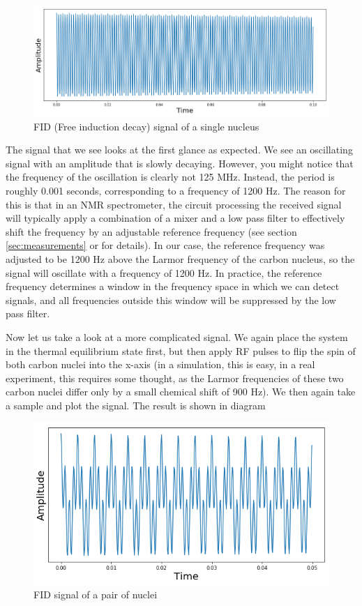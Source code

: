 \documentclass[a4paper, draft]{article}
\theoremstyle{own}
\theoremstyle{remark}
\begin{document}
\begin{figure}[ht]
\centering
\includegraphics[width=0.9\linewidth]{images/SingleNucleusNMRSignal}
\caption[FID (Free induction decay) signal of a single nucleus]{FID (Free induction decay) signal of a single nucleus}
\label{fig:SingleNucleusNMRSignal}
\end{figure}

The signal that we see looks at the first glance as expected. We see an oscillating signal with an amplitude that is slowly decaying. However, you might notice that the frequency of the oscillation is clearly not 125 MHz. Instead, the period is roughly 0.001 seconds, corresponding to a frequency of 1200 Hz. The reason for this is that in an NMR spectrometer, the circuit processing the received signal will typically apply a combination of a mixer and a low pass filter to effectively shift the frequency by an adjustable reference frequency (see section \ref{sec:measurements} or \cite{Levitt} for details). In our case, the reference frequency was adjusted to be 1200 Hz above the Larmor frequency of the carbon nucleus, so the signal will oscillate with a frequency of 1200 Hz. In practice, the reference frequency determines a window in the frequency space in which we can detect signals, and all frequencies outside this window will be suppressed by the low pass filter.

Now let us take a look at a more complicated signal. We again place the system in the thermal equilibrium state first, but then apply RF pulses to flip the spin of both carbon nuclei into the x-axis (in a simulation, this is easy, in a real experiment, this requires some thought, as the Larmor frequencies of these two carbon nuclei differ only by a small chemical shift of 900 Hz). We then again take a sample and plot the signal. The result is shown in diagram 

\begin{figure}[ht]
\centering
\includegraphics[width=0.9\linewidth]{images/TwoNucleiNMRSignal}
\caption[FID signal of a pair of nuclei]{FID signal of a pair of nuclei}
\label{fig:TwoNucleiNMRSignal}
\end{figure}
\end{document}
